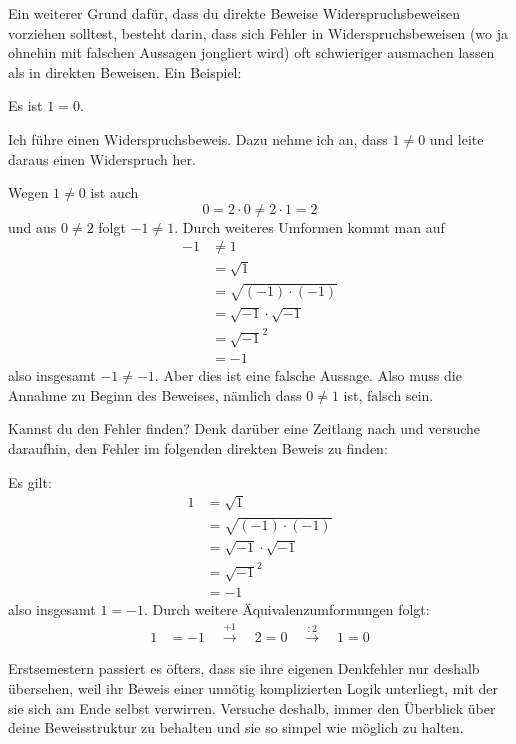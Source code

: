   
\begin{bsp}[*]
    Ein weiterer Grund dafür, dass du direkte Beweise Widerspruchsbeweisen vorziehen solltest, besteht darin, dass sich Fehler in Widerspruchsbeweisen (wo ja ohnehin mit falschen Aussagen jongliert wird) oft schwieriger ausmachen lassen als in direkten Beweisen. Ein Beispiel:
    \begin{satz}
        Es ist $1=0$.
    \end{satz}
    \begin{bew}
        Ich führe einen Widerspruchsbeweis. Dazu nehme ich an, dass $1\neq 0$ und leite daraus einen Widerspruch her.
        
        Wegen $1\neq 0$ ist auch
            \[ 0 = 2\cdot 0 \neq 2\cdot 1 = 2 \]
        und aus $0\neq 2$ folgt $-1\neq 1$. Durch weiteres Umformen kommt man auf
        \begin{align*}
            -1 & \neq 1 \\
            & = \sqrt{1} \\
            & = \sqrt{(-1)\cdot (-1)} \\
            & = \sqrt{-1} \cdot \sqrt{-1} \\
            & = \sqrt{-1}^2 \\
            & = -1
        \end{align*}
        also insgesamt $-1\neq -1$. Aber dies ist eine falsche Aussage. Also muss die Annahme zu Beginn des Beweises, nämlich dass $0\neq 1$ ist, falsch sein. 
    \end{bew}
    Kannst du den Fehler finden? Denk darüber eine Zeitlang nach und versuche daraufhin, den Fehler im folgenden direkten Beweis  zu finden:
    \begin{bew}
        Es gilt:
        \begin{align*}
            1 & = \sqrt{1} \\
            & = \sqrt{(-1)\cdot (-1)} \\
            & = \sqrt{-1}\cdot \sqrt{-1} \\
            & = \sqrt{-1}^2 \\
            & = -1
        \end{align*}
        also insgesamt $1=-1$. Durch weitere Äquivalenzumformungen folgt:
        \begin{align*}
            1 & = -1 \quad\xrightarrow{+1}\quad 2=0 \quad\xrightarrow{:2}\quad 1=0 
        \end{align*}
    \end{bew}
    Erstsemestern passiert es öfters, dass sie ihre eigenen Denkfehler nur deshalb übersehen, weil ihr Beweis einer unnötig komplizierten Logik unterliegt, mit der sie sich am Ende selbst verwirren. Versuche deshalb, immer den Überblick über deine Beweisstruktur zu behalten und sie so simpel wie möglich zu halten.
\end{bsp}



